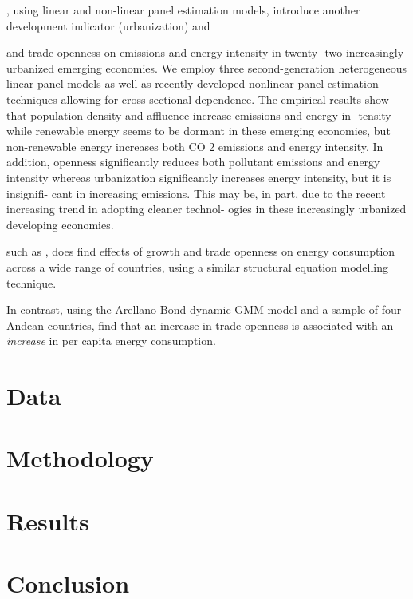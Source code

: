 \documentclass[12pt,a4paper]{article}
\begin{document}
\cite{rafiqUrbanizationOpennessEmissions2016}, using linear and non-linear panel estimation models, introduce another development indicator (urbanization) and 


 and trade openness on emissions and energy intensity in twenty-
two increasingly urbanized emerging economies. We employ three second-generation heterogeneous linear
panel models as well as recently developed nonlinear panel estimation techniques allowing for cross-sectional
dependence. The empirical results show that population density and affluence increase emissions and energy in-
tensity while renewable energy seems to be dormant in these emerging economies, but non-renewable energy
increases both CO 2 emissions and energy intensity. In addition, openness significantly reduces both pollutant
emissions and energy intensity whereas urbanization significantly increases energy intensity, but it is insignifi-
cant in increasing emissions. This may be, in part, due to the recent increasing trend in adopting cleaner technol-
ogies in these increasingly urbanized developing economies.



such as \cite{tibaIncomeTradeOpenness2018}, does find effects of growth and trade openness on energy consumption across a wide range of countries, using a similar structural equation modelling technique.







In contrast, using the Arellano-Bond dynamic GMM model and a sample of four Andean countries, \cite{koengkanPositiveImpactTrade2018} find that an increase in trade openness is associated with an 
\emph{increase} in per capita energy consumption. 




\section{Data}\label{sec:data}

\section{Methodology}\label{sec:methodology}

\section{Results}\label{sec:results}

\section{Conclusion}\label{sec:conclusion}
\end{document}
